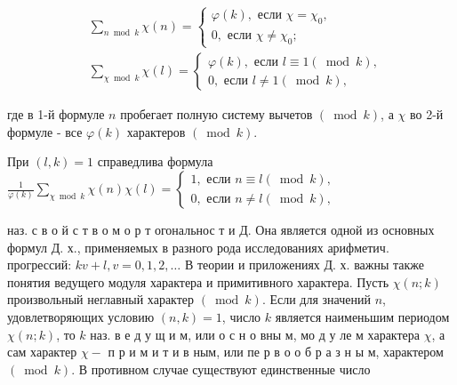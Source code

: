 \documentclass[10pt]{article}
\begin{document}
\[

\begin{aligned}

& \sum_{n \bmod k} \chi(n)=\left\{\begin{array}{c}

\varphi(k), \text { если } \chi=\chi_{0}, \\

0, \text { если } \chi \neq \chi_{0} ;

\end{array}\right. \\

& \sum_{\chi \bmod k} \chi(l)=\left\{\begin{array}{c}

\varphi(k), \text { если } l \equiv 1(\bmod k), \\

0, \text { если } l \neq 1(\bmod k),

\end{array}\right.

\end{aligned}

\]



где в 1-й формуле $n$ пробегает полную систему вычетов $(\bmod k)$, а $\chi$ во 2-й формуле - все $\varphi(k)$ характеров $(\bmod k)$.



При $(l, k)=1$ справедлива формула $\frac{1}{\varphi(k)} \sum_{\chi \bmod k} \chi(n) \chi(l)=\left\{\begin{array}{l}1, \text { если } n \equiv l(\bmod k), \\ 0, \text { если } n \neq l(\bmod k),\end{array}\right.$



наз. с в о й с т в о м о р т огональнос т и Д. Она является одной из основных формул Д. х., применяемых в разного рода исследованиях арифметич. прогрессий: $k v+l, v=0,1,2, \ldots$ В теории и приложениях Д. х. важны также понятия ведущего модуля характера и примитивного характера. Пусть $\chi(n ; k)$ произвольный неглавный характер $(\bmod k)$. Если для значений $n$, удовлетворяющих условию $(n, k)=1$, число $k$ является наименьшим периодом $\chi(n ; k)$, то $k$ наз. в е д у щ и м, или о с н о вны м, мо д у ле м характера $\chi$, а сам характер $\chi-$ п р и м и т и в ным, или пе р в о о б р а з н ы м, характером $(\bmod k)$. В противном случае существуют единственные число
\end{document}
